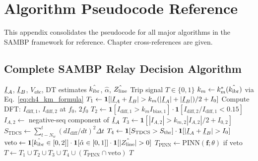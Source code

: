 \chapter{Algorithm Pseudocode Reference}
\label{app:algorithms}

This appendix consolidates the pseudocode for all major algorithms
in the SAMBP framework for reference. Chapter cross-references are given.

\section{Complete SAMBP Relay Decision Algorithm}
\label{app:alg_sambp_relay}

\begin{algorithm}[htbp]
\caption{SAMBP Relay: Complete Decision Logic (50~$\mu$s cycle)}
\label{alg:app_sambp_relay}
\begin{algorithmic}[1]
\Require $\underline{I}_A$, $\underline{I}_B$, $V_{abc}$, DT estimates
         $\hat{k_\mathrm{ibr}}$, $\hat{\alpha}$, $\hat{Z_\mathrm{line}}$
\Ensure Trip signal $T \in \{0,1\}$
\State {}
\State $k_m \leftarrow k_m^\ast(\hat{k_\mathrm{ibr}})$ via Eq.~\eqref{eq:ch4_km_formula}
\State $T_1 \leftarrow \mathbf{1}[|\underline{I}_A + \underline{I}_B| > k_m(|\underline{I}_A|+|\underline{I}_B|)/2 + I_0]$
\State {}
\State Compute DFT: $I_\mathrm{diff,1}$, $I_\mathrm{diff,2}$ at $f_0$, $2f_0$
\State $T_2 \leftarrow \mathbf{1}[I_\mathrm{diff,1} > k_m I_\mathrm{bias,1}] \cdot
         \mathbf{1}[I_\mathrm{diff,2}/I_\mathrm{diff,1} < 0.15]$
\State {}
\State $I_{A,2} \leftarrow$ negative-seq component of $\underline{I}_A$
\State $T_3 \leftarrow \mathbf{1}[|I_{A,2}| > k_{m,2}|I_{A,2}|/2 + I_{0,2}]$
\State {}
\State $S_\mathrm{TDCS} \leftarrow \sum_{t-N_w}^{t}(dI_\mathrm{diff}/dt)^2 \Delta t$
\State $T_4 \leftarrow \mathbf{1}[S_\mathrm{TDCS} > S_\mathrm{thr}] \cdot \mathbf{1}[|\underline{I}_A + \underline{I}_B| > I_0]$
\State {}
\State $\mathrm{veto} \leftarrow \mathbf{1}[\hat{k_\mathrm{ibr}} \in [0, 2]] \cdot
         \mathbf{1}[\hat{\alpha} \in [0, 1]] \cdot \mathbf{1}[|\hat{Z_\mathrm{line}}| > 0]$
\State {}
\State $T_\mathrm{PINN} \leftarrow \mathrm{PINN}(\mathbf{f}; \theta)$ if $\mathrm{veto}$
\State {}
\State $T \leftarrow T_1 \cup T_2 \cup T_3 \cup T_4 \cup (T_\mathrm{PINN} \cap \mathrm{veto})$
\State \Return $T$
\end{algorithmic}
\end{algorithm}

